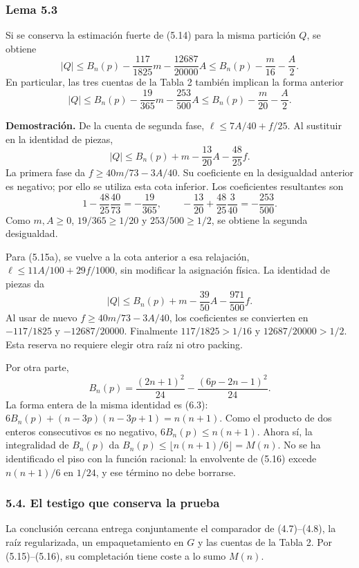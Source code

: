 \documentclass[spanish,11pt,a4paper]{article}
\begin{document}
\subsubsection{Lema 5.3}\label{lema-5.3}

Si se conserva la estimación fuerte de (5.14) para la misma partición \(Q\), se obtiene \[
|Q|\le B_n(p)-\frac{117}{1825}m-\frac{12687}{20000}A
\le B_n(p)-\frac m{16}-\frac A2.
\tag{5.15a}
\] En particular, las tres cuentas de la Tabla 2 también implican la forma anterior \[
|Q|\le B_n(p)-\frac{19}{365}m-\frac{253}{500}A
\le B_n(p)-\frac m{20}-\frac A2.
\tag{5.15}
\]

\textbf{Demostración.} De la cuenta de segunda fase, \(\ell\le7A/40+f/25\). Al sustituir en la identidad de piezas, \[
|Q|\le B_n(p)+m-\frac{13}{20}A-\frac{48}{25}f.
\] La primera fase da \(f\ge40m/73-3A/40\). Su coeficiente en la desigualdad anterior es negativo; por ello se utiliza esta cota inferior. Los coeficientes resultantes son \[
1-\frac{48}{25}\frac{40}{73}=-\frac{19}{365},\qquad
-\frac{13}{20}+\frac{48}{25}\frac3{40}=-\frac{253}{500}.
\] Como \(m,A\ge0\), \(19/365\ge1/20\) y \(253/500\ge1/2\), se obtiene la segunda desigualdad.

Para (5.15a), se vuelve a la cota anterior a esa relajación, \(\ell\le11A/100+29f/1000\), sin modificar la asignación física. La identidad de piezas da \[
|Q|\le B_n(p)+m-\frac{39}{50}A-\frac{971}{500}f.
\] Al usar de nuevo \(f\ge40m/73-3A/40\), los coeficientes se convierten en \(-117/1825\) y \(-12687/20000\). Finalmente \(117/1825>1/16\) y \(12687/20000>1/2\). Esta reserva no requiere elegir otra raíz ni otro packing.

Por otra parte, \[
B_n(p)=\frac{(2n+1)^2}{24}-\frac{(6p-2n-1)^2}{24}.
\tag{5.16}
\] La forma entera de la misma identidad es (6.3): \(6B_n(p)+(n-3p)(n-3p+1)=n(n+1)\). Como el producto de dos enteros consecutivos es no negativo, \(6B_n(p)\le n(n+1)\). Ahora sí, la integralidad de \(B_n(p)\) da \(B_n(p)\le\lfloor n(n+1)/6\rfloor=M(n)\). No se ha identificado el piso con la función racional: la envolvente de (5.16) excede \(n(n+1)/6\) en \(1/24\), y ese término no debe borrarse.

\subsubsection{5.4. El testigo que conserva la prueba}\label{el-testigo-que-conserva-la-prueba}

La conclusión cercana entrega conjuntamente el comparador de (4.7)--(4.8), la raíz regularizada, un empaquetamiento en \(G\) y las cuentas de la Tabla 2. Por (5.15)--(5.16), su completación tiene coste a lo sumo \(M(n)\).
\end{document}
